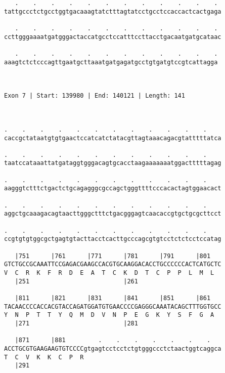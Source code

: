 \documentclass{article}
\begin{document}
\begin{Verbatim}
   .    .    .    .    .    .    .    .    .    .    .    . 
tattgccctctgcctggtgacaaagtatctttagtatcctgcctccaccactcactgaga
                                                            
   .    .    .    .    .    .    .    .    .    .    .    . 
ccttgggaaaatgatgggactaccatgcctccatttccttacctgacaatgatgcataac
                                                            
   .    .    .    .    .    .    .    .    .    .    .    .
aaagtctctcccagttgaatgcttaaatgatgagatgcctgtgatgtccgtcattagga
                                                           
                                                           
 
Exon 7 | Start: 139980 | End: 140121 | Length: 141



.    .    .    .    .    .    .    .    .    .    .    .    
caccgctataatgtgtgaactccatcatctatacgttagtaaacagacgtatttttatca
                                                            
.    .    .    .    .    .    .    .    .    .    .    .    
taatccataaattatgataggtgggacagtgcacctaagaaaaaaatggactttttagag
                                                            
.    .    .    .    .    .    .    .    .    .    .    .    
aagggtctttctgactctgcagagggcgccagctgggttttcccacactagtggaacact
                                                            
.    .    .    .    .    .    .    .    .    .    .    .    
aggctgcaaagacagtaacttgggctttctgacgggagtcaacaccgtgctgcgcttcct
                                                            
.    .    .    .    .    .    .    .    .    .    .    .    
ccgtgtgtggcgctgagtgtacttacctcacttgcccagcgtgtcctctctcctccatag
                                                            
   |751      |761      |771      |781      |791      |801   
GTCTGCCGCAAATTCCGAGACGAAGCCACGTGCAAGGACACCTGCCCCCCACTCATGCTC
V  C  R  K  F  R  D  E  A  T  C  K  D  T  C  P  P  L  M  L  
   |251                          |261                       
  
   |811      |821      |831      |841      |851      |861   
TACAACCCCACCACGTACCAGATGGATGTGAACCCCGAGGGCAAATACAGCTTTGGTGCC
Y  N  P  T  T  Y  Q  M  D  V  N  P  E  G  K  Y  S  F  G  A  
   |271                          |281                       
  
   |871      |881         .    .    .    .    .    .    .   
ACCTGCGTGAAGAAGTGTCCCCgtgagtcctcctctgtgggccctctaactggtcaggca
T  C  V  K  K  C  P  R                                      
   |291                                                     
  

\end{Verbatim}
\end{document}

